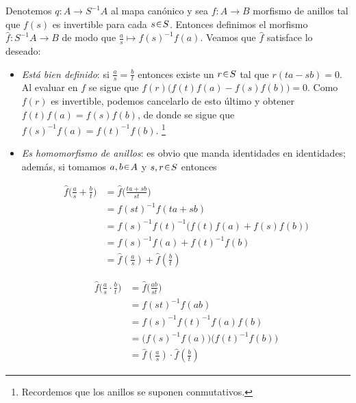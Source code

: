 \begin{sol}
Denotemos $q\colon A \to S^{-1}A$ al mapa canónico y sea $f \colon A \to B$ morfismo de anillos tal que $f(s)$ es invertible para cada $s\en S$. Entonces definimos el morfismo $\hat{f} \colon S^{-1}A \to B$ de modo que $\frac{a}{s} \mapsto f(s)^{-1}f(a)$. Veamos que $\hat{f}$ satisface lo deseado:
\begin{itemize}
\item\emph{Está bien definido}: si $\frac{a}{s} = \frac{b}{t}$ entonces existe un $r\en S$ tal que $r(ta - sb) = 0$. Al evaluar en $f$ se sigue que $f(r)\big(f(t)f(a) - f(s)f(b)\big) = 0$. Como $f(r)$ es invertible, podemos cancelarlo de esto último y obtener $f(t)f(a) = f(s)f(b)$, de donde se sigue que $f(s)^{-1}f(a) = f(t)^{-1}f(b)$.%
\footnote{Recordemos que los anillos se suponen conmutativos.}

\item\emph{Es homomorfismo de anillos}: es obvio que manda identidades en identidades; además, si tomamos $a,b\en A$ y $s,r\en S$ entonces\\
\vspace{0.5em}
\noindent
\begin{minipage}{0.48\linewidth}
\[
\begin{aligned}
\hat{f}\bigl(\tfrac{a}{s} + \tfrac{b}{t}\bigr)
&= \hat{f}\bigl(\tfrac{ta + sb}{st}\bigr)\\
&= f(st)^{-1}f(ta + sb)\\
&= f(s)^{-1}f(t)^{-1}\bigl(f(t)f(a) + f(s)f(b)\bigr)\\
&= f(s)^{-1}f(a) + f(t)^{-1}f(b)\\
&= \hat{f}(\tfrac{a}{s}) + \hat{f}(\tfrac{b}{t})
\end{aligned}
\]
\end{minipage}%
\hfill
\begin{minipage}{0.48\linewidth}
\[
\begin{aligned}
\hat{f}\bigl(\tfrac{a}{s} \cdot \tfrac{b}{t}\bigr)
&= \hat{f}\bigl(\tfrac{ab}{st}\bigr)\\
&= f(st)^{-1}f(ab)\\
&= f(s)^{-1}f(t)^{-1}f(a)f(b)\\
&= \bigl(f(s)^{-1}f(a)\bigr)\bigl(f(t)^{-1}f(b)\bigr)\\
&= \hat{f}(\tfrac{a}{s}) \cdot \hat{f}(\tfrac{b}{t})
\end{aligned}
\]
\end{minipage}


\end{itemize}
\end{sol}

